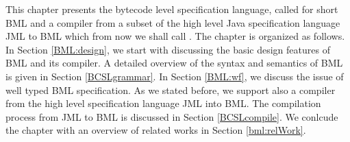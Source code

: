 
%

\newcommand{\code}{\textit{code}}
\newcommand{\indexComp}{\textit{index}}





This chapter presents the bytecode level specification language, called for short BML and a compiler from a
 subset of the high level Java specification language JML to BML which from now we shall call \JMLtoBML. 
The chapter is organized as follows.
In Section \ref{BML:design}, we start with discussing the basic design features of BML and its compiler. 
 A detailed overview of the syntax and semantics of BML is given in Section \ref{BCSLgrammar}.  
In Section \ref{BML:wf}, we discuss the issue of well typed BML specification. 
  As we stated before, we support also a compiler from the high level specification language JML into BML. The 
 compilation process from JML to BML is discussed in Section  \ref{BCSLcompile}.
 We conlcude the chapter with an overview of related works in Section \ref{bml:relWork}. 




